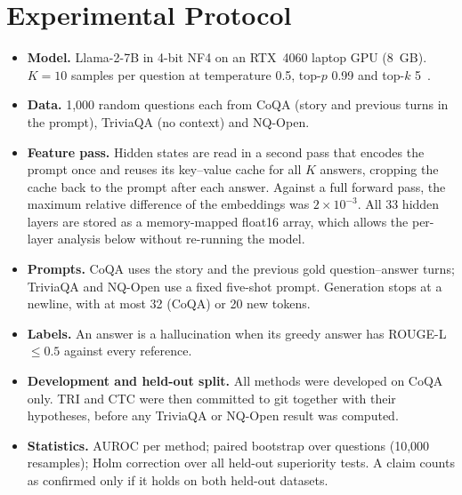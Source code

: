 \documentclass[journal]{IEEEtran}
\begin{document}
\section{Experimental Protocol}
\begin{itemize}
\item \textbf{Model.} Llama-2-7B in 4-bit NF4 on an RTX~4060 laptop GPU (8~GB). $K=10$ samples per question at temperature 0.5, top-$p$ 0.99 and top-$k$ 5~\cite{chen2024inside}.
\item \textbf{Data.} 1,000 random questions each from CoQA (story and previous turns in the prompt), TriviaQA (no context) and NQ-Open.
\item \textbf{Feature pass.} Hidden states are read in a second pass that encodes the prompt once and reuses its key--value cache for all $K$ answers, cropping the cache back to the prompt after each answer. Against a full forward pass, the maximum relative difference of the embeddings was $2\times10^{-3}$. All 33 hidden layers are stored as a memory-mapped float16 array, which allows the per-layer analysis below without re-running the model.
\item \textbf{Prompts.} CoQA uses the story and the previous gold question--answer turns; TriviaQA and NQ-Open use a fixed five-shot prompt. Generation stops at a newline, with at most 32 (CoQA) or 20 new tokens.
\item \textbf{Labels.} An answer is a hallucination when its greedy answer has ROUGE-L $\le 0.5$ against every reference.
\item \textbf{Development and held-out split.} All methods were developed on CoQA only. TRI and CTC were then committed to git together with their hypotheses, before any TriviaQA or NQ-Open result was computed.
\item \textbf{Statistics.} AUROC per method; paired bootstrap over questions (10,000 resamples); Holm correction over all held-out superiority tests. A claim counts as confirmed only if it holds on both held-out datasets.
\end{itemize}

\end{document}
